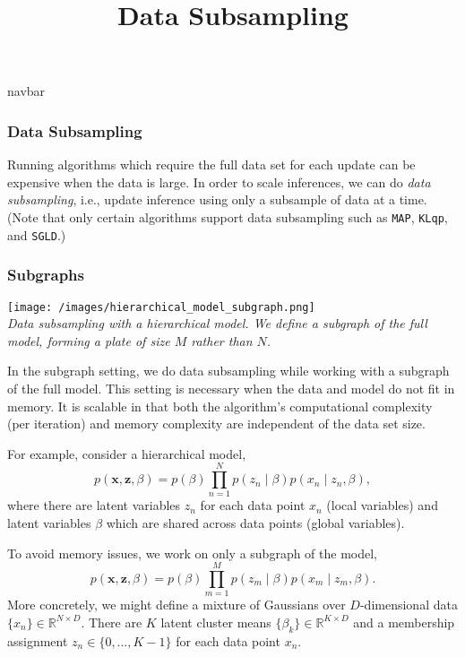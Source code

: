 \title{Data Subsampling}

{{navbar}}

\subsubsection{Data Subsampling}

Running algorithms which require the full data set for each update
can be expensive when the data is large. In order to scale inferences,
we can do \emph{data subsampling}, i.e., update inference using
only a subsample of data at a time.
(Note that only certain algorithms support data subsampling such as
\texttt{MAP}, \texttt{KLqp}, and \texttt{SGLD}.)

\subsubsection{Subgraphs}

\texttt{[image: /images/hierarchical\_model\_subgraph.png]} \\
{\small\textit{Data subsampling with a hierarchical model. We define
a subgraph of the full model, forming a plate of size $M$ rather than
$N$.}}

In the subgraph setting, we do data subsampling while working with a
subgraph of the full model. This setting is necessary when the data
and model do not fit in memory.
It is scalable in that both the
algorithm's computational complexity (per iteration) and memory
complexity are independent of the data set size.

For example, consider a hierarchical model,
\begin{equation*}
p(\mathbf{x}, \mathbf{z}, \beta)
= p(\beta) \prod_{n=1}^N p(z_n \mid \beta) p(x_n \mid z_n, \beta),
\end{equation*}
where there are latent variables $z_n$ for
each data point $x_n$ (local variables) and latent variables $\beta$
which are shared across data points (global variables).

To avoid memory issues, we work on only a subgraph of the model,
\begin{equation*}
p(\mathbf{x}, \mathbf{z}, \beta)
= p(\beta) \prod_{m=1}^M p(z_m \mid \beta) p(x_m \mid z_m, \beta).
\end{equation*}
More concretely, we might define a mixture of Gaussians over
$D$-dimensional data $\{x_n\}\in\mathbb{R}^{N\times D}$. There are $K$
latent cluster means $\{\beta_k\}\in\mathbb{R}^{K\times D}$ and a
membership assignment $z_n\in\{0,\ldots,K-1\}$ for each data point
$x_n$.

